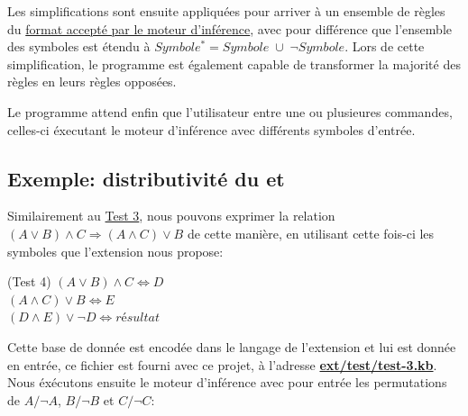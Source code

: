 \documentclass[12pt]{article}
\begin{document}
Les simplifications sont ensuite appliquées pour arriver à un ensemble de règles du \hyperref[MI]{format accepté par le moteur d'inférence}, avec pour différence que l'ensemble des symboles est étendu à $Symbole^{*} = Symbole \; \cup \; \neg Symbole$.
Lors de cette simplification, le programme est également capable de transformer la majorité des règles en leurs règles opposées.

Le programme attend enfin que l'utilisateur entre une ou plusieures commandes, celles-ci éxecutant le moteur d'inférence avec différents symboles d'entrée.

\subsection{Exemple: distributivité du \og et \fg}

Similairement au \hyperref[T3]{Test 3}, nous pouvons exprimer la relation $(A \lor B) \land C \Rightarrow (A \land C) \lor B$ de cette manière, en utilisant cette fois-ci les symboles que l'extension nous propose:

\begin{algorithm}[H]
\BeginKB(Test 4\label{T4}){
  $(A \lor B) \land C \Leftrightarrow D$ \\
  $(A \land C) \lor B \Leftrightarrow E$ \\
  $(D \land E) \lor \neg D \Leftrightarrow \textit{résultat}$
}
\end{algorithm}

Cette base de donnée est encodée dans le langage de l'extension et lui est donnée en entrée, ce fichier est fourni avec ce projet, à l'adresse \href{https://github.com/adri326/lo21-project/blob/main/ext/test/test-3.kb}{\textbf{ext/test/test-3.kb}}.
Nous éxécutons ensuite le moteur d'inférence avec pour entrée les permutations de $A/\neg A$, $B/\neg B$ et $C/\neg C$:
\end{document}
